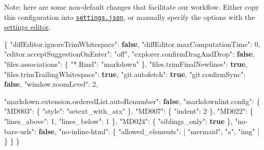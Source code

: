 \documentclass[
]{book}
\newenvironment{Shaded}{\begin{snugshade}}{\end{snugshade}}
\newcommand{\DataTypeTok}[1]{\textcolor[rgb]{0.13,0.29,0.53}{#1}}
\newcommand{\DecValTok}[1]{\textcolor[rgb]{0.00,0.00,0.81}{#1}}
\newcommand{\FunctionTok}[1]{\textcolor[rgb]{0.00,0.00,0.00}{#1}}
\newcommand{\KeywordTok}[1]{\textcolor[rgb]{0.13,0.29,0.53}{\textbf{#1}}}
\newcommand{\OtherTok}[1]{\textcolor[rgb]{0.56,0.35,0.01}{#1}}
\newcommand{\StringTok}[1]{\textcolor[rgb]{0.31,0.60,0.02}{#1}}
\begin{document}
\begin{itemize}
  Note: here are some non-default changes that facilitate our workflow. Either copy this configuration into \href{https://code.visualstudio.com/docs/getstarted/tips-and-tricks\#_tune-your-settings}{\texttt{settings.json}}, or manually specify the options with the \href{https://code.visualstudio.com/docs/getstarted/settings}{settings editor}.

\begin{Shaded}
\begin{Highlighting}[]
\FunctionTok{\{}
    \DataTypeTok{"diffEditor.ignoreTrimWhitespace"}\FunctionTok{:} \KeywordTok{false}\FunctionTok{,}
    \DataTypeTok{"diffEditor.maxComputationTime"}\FunctionTok{:} \DecValTok{0}\FunctionTok{,}
    \DataTypeTok{"editor.acceptSuggestionOnEnter"}\FunctionTok{:} \StringTok{"off"}\FunctionTok{,}
    \DataTypeTok{"explorer.confirmDragAndDrop"}\FunctionTok{:} \KeywordTok{false}\FunctionTok{,}
    \DataTypeTok{"files.associations"}\FunctionTok{:} \FunctionTok{\{}
        \DataTypeTok{"*.Rmd"}\FunctionTok{:} \StringTok{"markdown"}
    \FunctionTok{\},}
    \DataTypeTok{"files.trimFinalNewlines"}\FunctionTok{:} \KeywordTok{true}\FunctionTok{,}
    \DataTypeTok{"files.trimTrailingWhitespace"}\FunctionTok{:} \KeywordTok{true}\FunctionTok{,}
    \DataTypeTok{"git.autofetch"}\FunctionTok{:} \KeywordTok{true}\FunctionTok{,}
    \DataTypeTok{"git.confirmSync"}\FunctionTok{:} \KeywordTok{false}\FunctionTok{,}
    \DataTypeTok{"window.zoomLevel"}\FunctionTok{:} \DecValTok{2}\FunctionTok{,}

    \DataTypeTok{"markdown.extension.orderedList.autoRenumber"}\FunctionTok{:} \KeywordTok{false}\FunctionTok{,}
    \DataTypeTok{"markdownlint.config"}\FunctionTok{:} \FunctionTok{\{}
        \DataTypeTok{"MD003"}\FunctionTok{:} \FunctionTok{\{} \DataTypeTok{"style"}\FunctionTok{:} \StringTok{"setext\_with\_atx"} \FunctionTok{\},}
        \DataTypeTok{"MD007"}\FunctionTok{:} \FunctionTok{\{} \DataTypeTok{"indent"}\FunctionTok{:} \DecValTok{2} \FunctionTok{\},}
        \DataTypeTok{"MD022"}\FunctionTok{:} \FunctionTok{\{} \DataTypeTok{"lines\_above"}\FunctionTok{:} \DecValTok{1}\FunctionTok{,}
                   \DataTypeTok{"lines\_below"}\FunctionTok{:} \DecValTok{1} \FunctionTok{\},}
        \DataTypeTok{"MD024"}\FunctionTok{:} \FunctionTok{\{} \DataTypeTok{"siblings\_only"}\FunctionTok{:} \KeywordTok{true} \FunctionTok{\},}
        \DataTypeTok{"no{-}bare{-}urls"}\FunctionTok{:} \KeywordTok{false}\FunctionTok{,}
        \DataTypeTok{"no{-}inline{-}html"}\FunctionTok{:} \FunctionTok{\{}
          \DataTypeTok{"allowed\_elements"}\FunctionTok{:} \OtherTok{[}
            \StringTok{"mermaid"}\OtherTok{,}
            \StringTok{"a"}\OtherTok{,}
            \StringTok{"img"}
          \OtherTok{]}
        \FunctionTok{\}}
    \FunctionTok{\}}
\FunctionTok{\}}
\end{Highlighting}
\end{Shaded}


\end{itemize}
\end{document}
